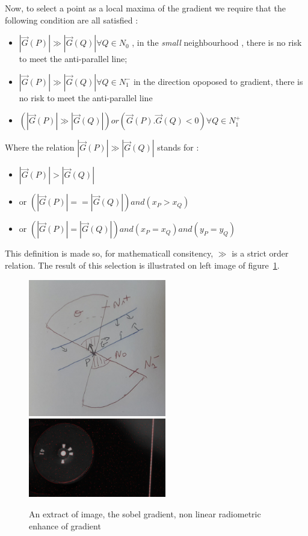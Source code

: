 Now, to select  a point as a local maxima of the gradient we require that the following condition are
all satisfied :

\begin{itemize}
    \item  $|\vec G(P)|  \gg  |\vec G(Q)|  \forall  Q \in N_0$ , in the  \emph{small} neighbourhood , there is no risk
           to meet the anti-parallel line;

    \item  $|\vec G(P)|  \gg  |\vec G(Q)|  \forall  Q \in N_1 ^-$ in the direction opoposed to gradient, there is
           no risk to meet the anti-parallel line 

            
    \item  $ (|\vec G(P)|  \gg  |\vec G(Q)|)  or (\vec G(P) . \vec G(Q) <0 )    \forall  Q \in N_1 ^+$

\end{itemize}

Where the relation  $ |\vec G(P)|  \gg  |\vec G(Q)| $ stands for :

\begin{itemize} 
     \item  $|\vec G(P)|  > |\vec G(Q)| $  
     \item or $(|\vec G(P)|  == |\vec G(Q)|) and (x_P >x_Q) $ 
     \item or $(|\vec G(P)|  = |\vec G(Q)|) and (x_P =x_Q)  and (y_P=y_Q)$
\end{itemize} 

This definition is made so, for mathematicall consitency,  $\gg$  is a strict order relation.
The result of this selection is illustrated on left image of  figure~\ref{Fig:Line:MaxLocGrad}.

\begin{figure}
\centering
        \includegraphics[width=6cm]{Methods/ImagesFils/NeighMaxLoc.jpg}
        \includegraphics[width=6cm]{Methods/ImagesFils/MaxLocGrad.jpg}
        \caption{An extract of image, the sobel gradient, non linear radiometric enhance of gradient}
\label{Fig:Line:MaxLocGrad}
\end{figure}

